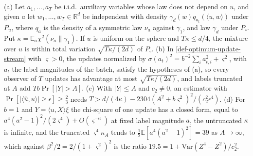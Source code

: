 \begin{theorem}
(a) Let $a_1,\dots,a_T$ be i.i.d.\ auxiliary variables whose law does not depend on
$u$, and given $a$ let $w_1,\dots,w_T\in\mathbb R^d$ be independent with density
$\gamma_d(w)q_{a_t}(\langle u,w\rangle)$ under $P_u$, where $q_a$ is the density of a
symmetric law $\nu_a$ against $\gamma_1$, and law $\gamma_d$ under $P_\circ$. Put
$\kappa=\mathbb E_a\chi^2(\nu_a\|\gamma_1)$. If $u$ is uniform on the sphere and
$T\kappa\le d/4$, the mixture over $u$ is within total variation $\sqrt{T\kappa/(2d)}$
of $P_\circ$. (b) In \cref{def-optimum-update-stream} with $\varsigma>0$, the updates
normalized by $\sigma(a_t)^2=b^{-2}\sum_ia_{t,i}^2+\varsigma^2$, with $a_t$ the label
magnitudes of the batch, satisfy the hypotheses of (a), so every observer of $T$
updates has advantage at most $\sqrt{T\kappa/(2d)}$, and labels truncated at $A$ add
$Tb\Pr[\lvert Y\rvert>A]$. (c) With $\lvert Y\rvert\le A$ and $c_2\ne0$, an estimator
with $\Pr[\lvert\langle\hat u,u\rangle\rvert\ge\epsilon]\ge\frac23$ needs
$T>d/(4\kappa)-2304(A^2+b\varsigma^2)^2/(c_2^2\epsilon^4)$. (d) For $b=1$ and
$Y=\langle u,X\rangle\xi$ the chi-square of one update has a closed form, equal to
$a^4(a^2-1)^2/(2\varsigma^4)+O(\varsigma^{-6})$ at fixed label magnitude $a$, the
untruncated $\kappa$ is infinite, and the truncated $\varsigma^4\kappa_A$ tends to
$\frac12\mathbb E[a^4(a^2-1)^2]=39$ as $A\to\infty$, which against
$\beta^2/2=2/(1+\varsigma^2)^2$ is the ratio $19.5=1+\mathrm{Var}(Z^4-Z^2)/c_2^2$.
\end{theorem}

